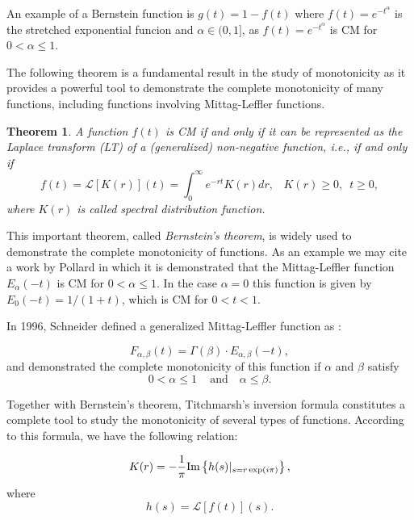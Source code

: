 \documentclass[12pt]{amsart}
\numberwithin{equation}{section}
\newtheorem{teo}{Theorem}[section]
\begin{document}
An example of a Bernstein function is $g(t)=1-f(t)$ where $f(t)=e^{-t^\alpha}$
is the stretched exponential funcion and $\alpha \in (0,1]$, as
$f(t)=e^{-t^\alpha}$ is CM for $0<\alpha\leq1$. 

The following theorem is a fundamental result in the study of 
monotonicity as it provides a powerful tool to demonstrate the complete
monotonicity of many functions, including functions involving
Mittag-Leffler functions. 

\begin{teo}

A function $f(t)$ is {\rm{CM}} if and only if it can be represented as the
	Laplace transform {\rm{(LT)}} of a {\rm{(}}generalized{\rm{)}}
	non-negative function, i.e., if and only if 
\begin{equation}
f(t)=\mathscr{L}[K(r)](t)=\int_0^{\infty}e^{-rt}K(r)dr,\,\,\,\,\,K(r)\geq0,\,\,\,t\geq0,
\label{distri}
\end{equation}
where $K(r)$ is called spectral distribution function. 
\label{teoremaimportantee}
\end{teo}

This important theorem, called \textit{Bernstein's theorem}, is widely used
to demonstrate the complete monotonicity of functions. As an example we may
cite a work by Pollard \cite{Pollard:1948} in which it is demonstrated that
the Mittag-Leffler function $E_\alpha(-t)$ is {\rm{CM}} for
$0<\alpha\leq1$. In the case $\alpha =0$ this function is given by $E_0(-t)
= 1/(1+t)$, which is CM for $0<t<1$. 

In 1996, Schneider defined a generalized Mittag-Leffler function as
\cite{Schneider:1996}:

\begin{equation}
F_{\alpha,\beta}(t)=\Gamma(\beta)\cdot E_{\alpha,\beta}(-t),
\label{MLG}
\end{equation}
and demonstrated the complete monotonicity of this function if $\alpha$ and
$\beta$ satisfy 
\begin{equation}
0<\alpha\leq1\,\,\,\,\,\,\,\mbox{and}\,\,\,\,\,\,\alpha\leq\beta.
\end{equation}

Together with Bernstein's theorem, Titchmarsh's inversion formula
\cite{Titchmarsh:1948} constitutes a complete tool to study the
monotonicity of several types of functions. According to this formula, we
have the following relation: 

\begin{equation}
K(r)=-\frac{1}{\pi} \mbox{Im}\left\{h(s)\begin{large}|
\end{large}_{s=r\exp( i \pi)}\right\},
\label{imag}
\end{equation}
where 
\begin{equation}
h(s)= \mathscr{L}[f(t)](s).
\label{artigo26}
\end{equation}
\end{document}

